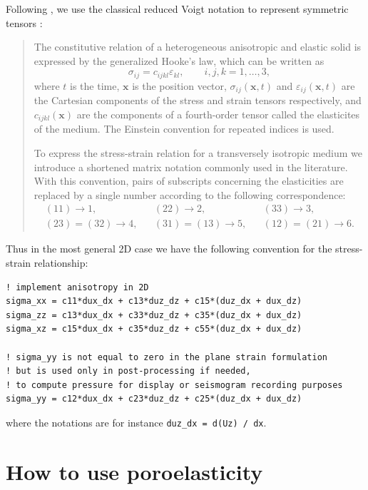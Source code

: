 \documentclass[oneside,english,onecolumn,letterpaper]{book}
\begin{document}
Following \cite{CaKoKo88}, we use the classical reduced Voigt notation to represent symmetric
tensors \citep{Hel94,Car07}:
%
\begin{quotation}
The constitutive relation of a heterogeneous anisotropic and elastic solid
is expressed by the generalized Hooke's law, which can be written as
%
\begin{equation*}
\sigma_{ij} = c_{ijkl} \varepsilon_{kl}, \qquad i, j, k = 1, \dots, 3,
\end{equation*}
%
where $t$ is the time, $\mathbf{x}$ is the position vector, $\sigma_{ij}(\mathbf{x}, t)$ and $\varepsilon_{ij}(\mathbf{x}, t)$ are the
Cartesian components of the stress and strain tensors respectively, and
$c_{ijkl}(\mathbf{x})$ are the components of a fourth-order tensor called the elasticites of
the medium. The Einstein convention for repeated indices is used.

To express the stress-strain relation for a transversely isotropic medium
we introduce a shortened matrix notation commonly used in the literature.
With this convention, pairs of subscripts concerning the elasticities are
replaced by a single number according to the following correspondence:
%
\begin{align*}
(11) \rightarrow 1, &&
(22) \rightarrow 2, &&
(33) \rightarrow 3, \\
(23) = (32) \rightarrow 4, &&
(31) = (13) \rightarrow 5, &&
(12) = (21) \rightarrow 6.
\end{align*}
\end{quotation}
%
Thus in the most general 2D case we have the following convention for the stress-strain relationship:
%
\begin{verbatim}
! implement anisotropy in 2D
sigma_xx = c11*dux_dx + c13*duz_dz + c15*(duz_dx + dux_dz)
sigma_zz = c13*dux_dx + c33*duz_dz + c35*(duz_dx + dux_dz)
sigma_xz = c15*dux_dx + c35*duz_dz + c55*(duz_dx + dux_dz)

! sigma_yy is not equal to zero in the plane strain formulation
! but is used only in post-processing if needed,
! to compute pressure for display or seismogram recording purposes
sigma_yy = c12*dux_dx + c23*duz_dz + c25*(duz_dx + dux_dz)
\end{verbatim}
%
where the notations are for instance \texttt{duz\_dx = d(Uz) / dx}.


\section{How to use poroelasticity}
\end{document}
